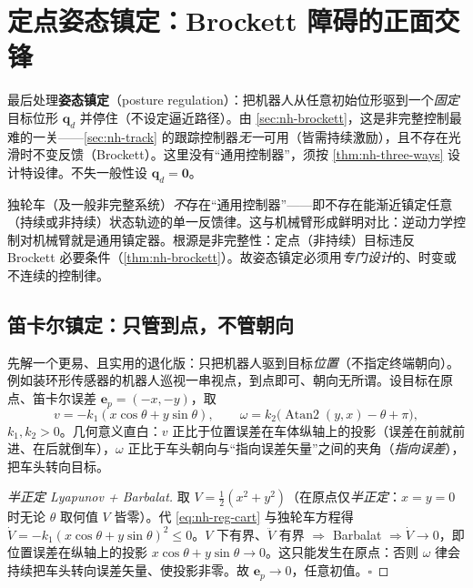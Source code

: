 \section{定点姿态镇定：Brockett 障碍的正面交锋}
\label{sec:nh-reg}

最后处理\textbf{姿态镇定}（posture regulation）：把机器人从任意初始位形驱到一个\emph{固定}目标位形 $\mathbf{q}_d$ 并停住（不设定逼近路径）。由 \cref{sec:nh-brockett}，这是非完整控制最难的一关——\cref{sec:nh-track} 的跟踪控制器\emph{无一}可用（皆需持续激励），且不存在光滑时不变反馈（Brockett）。这里没有“通用控制器”，须按 \cref{thm:nh-three-ways} 设计特设律。不失一般性设 $\mathbf{q}_d=\mathbf{0}$。

\begin{theorem}[非完整系统无通用镇定器]\label{thm:nh-no-universal}
独轮车（及一般非完整系统）\emph{不}存在“通用控制器”——即不存在能渐近镇定任意（持续或非持续）状态轨迹的单一反馈律。这与机械臂形成鲜明对比：逆动力学控制对机械臂就是通用镇定器。根源是非完整性：定点（非持续）目标违反 Brockett 必要条件（\cref{thm:nh-brockett}）。故姿态镇定必须用\emph{专门设计}的、时变或不连续的控制律。
\end{theorem}

\subsection{笛卡尔镇定：只管到点，不管朝向}
\label{sec:nh-reg-cart}

先解一个更易、且实用的退化版：只把机器人驱到目标\emph{位置}（不指定终端朝向）。例如装环形传感器的机器人巡视一串视点，到点即可、朝向无所谓。设目标在原点、笛卡尔误差 $\mathbf{e}_p=(-x,-y)$，取
\begin{equation}
  v=-k_1(x\cos\theta+y\sin\theta),\qquad \omega=k_2\big(\operatorname{Atan2}(y,x)-\theta+\pi\big),
  \label{eq:nh-reg-cart}
\end{equation}
$k_1,k_2>0$。几何意义直白：$v$ 正比于位置误差在车体纵轴上的投影（误差在前就前进、在后就倒车），$\omega$ 正比于车头朝向与“指向误差矢量”之间的夹角（\emph{指向误差}），把车头转向目标。

\begin{proof}[半正定 Lyapunov + Barbalat]
取 $V=\tfrac12(x^2+y^2)$（在原点仅\emph{半正定}：$x{=}y{=}0$ 时无论 $\theta$ 取何值 $V$ 皆零）。代 \cref{eq:nh-reg-cart} 与独轮车方程得 $\dot V=-k_1(x\cos\theta+y\sin\theta)^2\le0$。$V$ 下有界、$\ddot V$ 有界 $\Rightarrow$ Barbalat $\Rightarrow\dot V\to0$，即位置误差在纵轴上的投影 $x\cos\theta+y\sin\theta\to0$。这只能发生在原点：否则 $\omega$ 律会持续把车头转向误差矢量、使投影非零。故 $\mathbf{e}_p\to0$，任意初值。$\square$
\end{proof}

